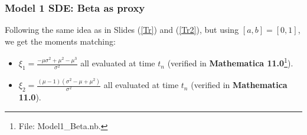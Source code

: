 \documentclass[aspectratio=169]{beamer}\usepackage[utf8]{inputenc}
\begin{document}

\begin{frame}\frametitle{Model 1 SDE: Beta as proxy}

Following the same idea as in Slides (\ref{Tr}) and (\ref{Tr2}), but using $[a,b]=[0,1]$, we get the moments matching:
\begin{itemize}
\item $\xi_1=\frac{-\mu\sigma^2+\mu^2-\mu^3}{\sigma^2}$ all evaluated at time $t_n$ (verified in \textbf{Mathematica 11.0}\footnote{File: {\color{blue}Model1\_Beta.nb}.}).
\item $\xi_2=\frac{(\mu-1)(\sigma^2-\mu+\mu^2)}{\sigma^2}$ all evaluated at time $t_n$ (verified in \textbf{Mathematica 11.0}).
\end{itemize}
\end{frame}

\end{document}
